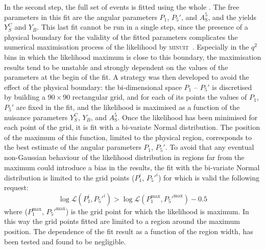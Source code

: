 In the second step, the full set of events is fitted using the whole \pdf.
The free parameters in this fit are the angular parameters $P_1$, $P_5'$, and $A^5_\mathrm{S}$, and the yields $Y^{C}_{S}$ and $Y_{B}$.
This last fit cannot be run in a single step, since the presence of a physical boundary for the validity of the fitted parameters complicates the numerical maximisation process of the likelihood by \textsc{minuit}~\cite{Minuit}.
Especially in the $q^2$ bins in which the likelihood maximum is close to this boundary, the maximisation results tend to be unstable and strongly dependent on the values of the parameters at the begin of the fit.
A strategy was then developed to avoid the effect of the physical boundary: the bi-dimensional space $P_1$ -- $P_5'$ is discretised by building a $90\times90$ rectangular grid, and for each of its points the values of $P_1$, $P_5'$ are fixed in the fit, and the likelihood is maximised as a function of the nuisance parameters $Y^{C}_{S}$, $Y_{B}$, and $A^5_\mathrm{S}$.
Once the likelihood has been minimised for each point of the grid, it is fit with a bi-variate Normal distribution.
The position of the maximum of this function, limited to the physical region, corresponds to the best estimate of the angular parameters $P_1$, $P_5'$.
To avoid that any eventual non-Gaussian behaviour of the likelihood distribution in regions far from the maximum could introduce a bias in the results, the fit with the bi-variate Normal distribution is limited to the grid points ($P_1^i$, $P_5'^i$) for which is valid the following request: $$\log\mathcal{L}(P_1^i,P_5'^i) > \log\mathcal{L}(P_1^{\mathrm{max}},P_5'^{\mathrm{max}}) - 0.5$$ where ($P_1^{\mathrm{max}}$, $P_5'^{\mathrm{max}}$) is the grid point for which the likelihood is maximum.
In this way the grid points fitted are limited to a region around the maximum position.
The dependence of the fit result as a function of the region width, has been tested and found to be negligible.

